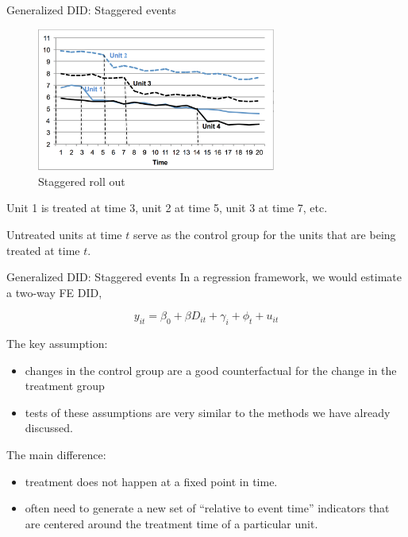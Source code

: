 \documentclass[
  ignorenonframetext,
]{beamer}
\begin{document}
\begin{frame}{Generalized DID: Staggered events}
\protect\hypertarget{generalized-did-staggered-events-1}{}
\begin{figure}
\centering
\includegraphics[width=0.7\textwidth,height=\textheight]{"images/PanelRollout.png"}
\caption{Staggered roll out}
\end{figure}

Unit 1 is treated at time 3, unit 2 at time 5, unit 3 at time 7, etc.

Untreated units at time \(t\) serve as the control group for the units
that are being treated at time \(t\).
\end{frame}

\begin{frame}{Generalized DID: Staggered events}
\protect\hypertarget{generalized-did-staggered-events-2}{}
In a regression framework, we would estimate a two-way FE DID,

\[
y_{it}=\beta_0+\beta D_{it}+\gamma_i+\phi_t+u_{it}
\]

The key assumption:

\begin{itemize}
\item
  changes in the control group are a good counterfactual for the change
  in the treatment group
\item
  tests of these assumptions are very similar to the methods we have
  already discussed.
\end{itemize}

The main difference:

\begin{itemize}
\item
  treatment does not happen at a fixed point in time.
\item
  often need to generate a new set of ``relative to event time''
  indicators that are centered around the treatment time of a particular
  unit.
\end{itemize}
\end{frame}
\end{document}
